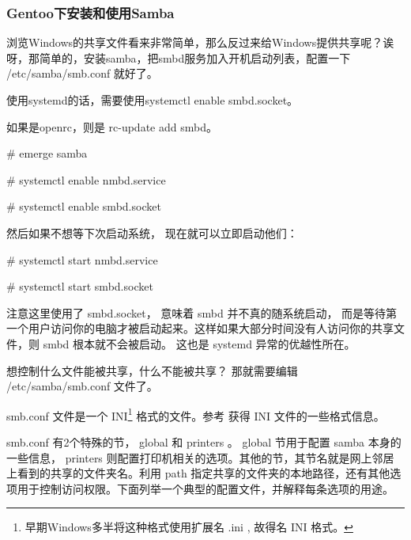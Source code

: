 \subsubsection{Gentoo下安装和使用Samba}

浏览Windows的共享文件看来非常简单，那么反过来给Windows提供共享呢？诶呀，那简单的，安装samba，把smbd服务加入开机启动列表，配置一下 /etc/samba/smb.conf 就好了。

使用systemd的话，需要使用systemctl enable smbd.socket。

如果是openrc，则是 rc-update add smbd。

\begin{code}
\# emerge samba

\# systemctl enable  nmbd.service

\# systemctl enable  smbd.socket
\end{code}

然后如果不想等下次启动系统， 现在就可以立即启动他们：

\begin{code}
\# systemctl start  nmbd.service

\# systemctl start  smbd.socket

\end{code}

注意这里使用了 smbd.socket， 意味着 smbd 并不真的随系统启动， 而是等待第一个用户访问你的电脑才被启动起来。这样如果大部分时间没有人访问你的共享文件，则 smbd 根本就不会被启动。 这也是 systemd 异常的优越性所在。

想控制什么文件能被共享，什么不能被共享？ 那就需要编辑 /etc/samba/smb.conf 文件了。


smb.conf 文件是一个 INI\footnote{早期Windows多半将这种格式使用扩展名 .ini , 故得名 INI 格式。} 格式的文件。参考  获得 INI 文件的一些格式信息。

smb.conf 有2个特殊的节， global 和 printers 。 global 节用于配置 samba 本身的一些信息， printers 则配置打印机相关的选项。其他的节，其节名就是网上邻居上看到的共享的文件夹名。利用 path 指定共享的文件夹的本地路径，还有其他选项用于控制访问权限。下面列举一个典型的配置文件，并解释每条选项的用途。


